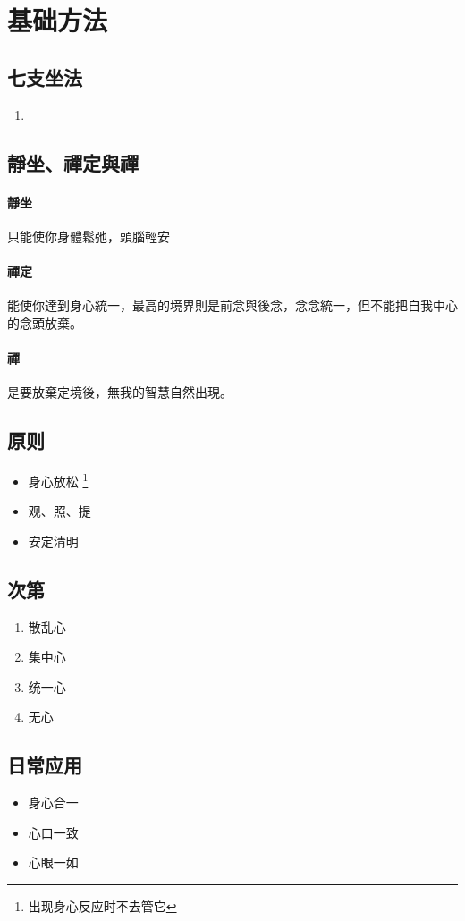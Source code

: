 \section{基础方法}

\subsection{七支坐法}
\begin{enumerate}
  \item
\end{enumerate}

\subsection{靜坐、禪定與禪}
\paragraph{靜坐} 只能使你身體鬆弛，頭腦輕安
\paragraph{禪定} 能使你達到身心統一，最高的境界則是前念與後念，念念統一，但不能把自我中心的念頭放棄。
\paragraph{禪} 是要放棄定境後，無我的智慧自然出現。

\subsection{原则}
\begin{itemize}
  \item 身心放松
    \footnote{出现身心反应时不去管它}
  \item 观、照、提
  \item 安定清明
\end{itemize}


\subsection{次第}
\begin{enumerate}
  \item 散乱心
  \item 集中心
  \item 统一心
  \item 无心
\end{enumerate}

\subsection{日常应用}
\begin{itemize}
  \item 身心合一
  \item 心口一致
  \item 心眼一如
\end{itemize}
